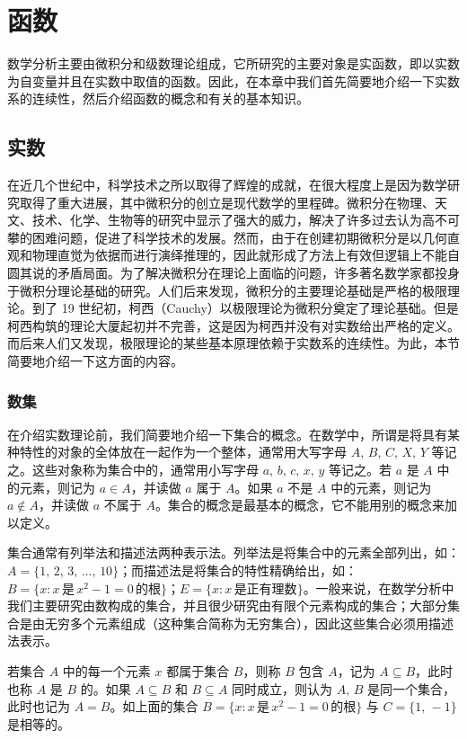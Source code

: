 \documentclass[UTF8,12pt,a4paper,fontset=fandol]{ctexbook}
\begin{document}
\raggedbottom


\chapter{函数}
数学分析主要由微积分和级数理论组成，它所研究的主要对象是实函数，即以实数为自变量并且在实数中取值的函数。因此，在本章中我们首先简要地介绍一下实数系的连续性，然后介绍函数的概念和有关的基本知识。


\section{实数}
在近几个世纪中，科学技术之所以取得了辉煌的成就，在很大程度上是因为数学研究取得了重大进展，其中微积分的创立是现代数学的里程碑。微积分在物理、天文、技术、化学、生物等的研究中显示了强大的威力，解决了许多过去认为高不可攀的困难问题，促进了科学技术的发展。然而，由于在创建初期微积分是以几何直观和物理直觉为依据而进行演绎推理的，因此就形成了方法上有效但逻辑上不能自圆其说的矛盾局面。为了解决微积分在理论上面临的问题，许多著名数学家都投身于微积分理论基础的研究。人们后来发现，微积分的主要理论基础是严格的极限理论。到了 19 世纪初，柯西（Cauchy）以极限理论为微积分奠定了理论基础。但是柯西构筑的理论大厦起初并不完善，这是因为柯西并没有对实数给出严格的定义。而后来人们又发现，极限理论的某些基本原理依赖于实数系的连续性。为此，本节简要地介绍一下这方面的内容。


\subsection{数集}
在介绍实数理论前，我们简要地介绍一下集合的概念。在数学中，所谓是将具有某种特性的对象的全体放在一起作为一个整体，通常用大写字母 $A,\,B,\,C,\,X,\,Y$ 等记之。这些对象称为集合中的，通常用小写字母 $a,\,b,\,c,\,x,\,y$ 等记之。若 $a$ 是 $A$ 中的元素，则记为 $a\in A$，并读做 $a$ 属于 $A$。如果 $a$ 不是 $A$ 中的元素，则记为 $a\notin A$，并读做 $a$ 不属于 $A$。集合的概念是最基本的概念，它不能用别的概念来加以定义。


集合通常有列举法和描述法两种表示法。列举法是将集合中的元素全部列出，如：$A=\{1,\,2,\,3,\,\dots,\,10\}$；而描述法是将集合的特性精确给出，如：$B=\{x:x\,\text{是}\,x^2-1=0\,\text{的根}\}$；$E=\{x:x\,\text{是正有理数}\}$。一般来说，在数学分析中我们主要研究由数构成的集合，并且很少研究由有限个元素构成的集合；大部分集合是由无穷多个元素组成（这种集合简称为无穷集合），因此这些集合必须用描述法表示。


若集合 $A$ 中的每一个元素 $x$ 都属于集合 $B$，则称 $B$ 包含 $A$，记为 $A \subseteq B$，此时也称 $A$ 是 $B$ 的。如果 $A \subseteq B$ 和 $B \subseteq A$ 同时成立，则认为 $A,\,B$ 是同一个集合，此时也记为 $A=B$。如上面的集合 $B=\{x:x\, \text{是}\, x^2-1=0\,\text{的根}\}$ 与 $C=\{1,\, -1\}$ 是相等的。
\end{document}
